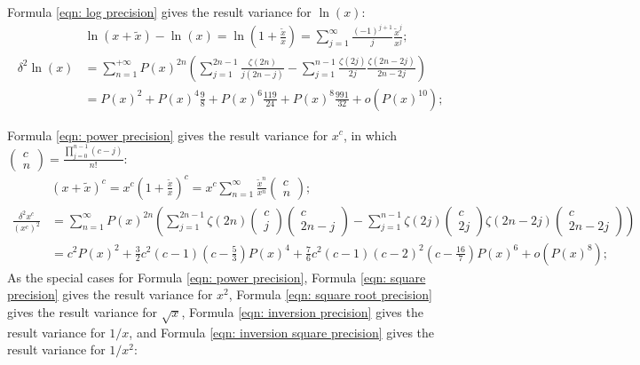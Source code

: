 \documentclass[twoside]{article}
\numberwithin{equation}{section}
\begin{document}
Formula \eqref{eqn: log precision} gives the result variance for $\ln(x)$:
\begin{align}
\label{eqn: log Taylor}
& \ln(x + \tilde{x}) - \ln(x) = \ln(1 + \frac{\tilde{x}}{x}) = \sum_{j=1}^{\infty} \frac{(-1)^{j+1}}{j} \frac{\tilde{x}^j}{x^j}; \\
\label{eqn: log precision}
\delta^2 \ln(x) &= \sum_{n=1}^{+\infty} P(x)^{2n} \left(\sum_{j=1}^{2n-1} \frac{\zeta(2n)}{j (2n-j)}
   - \sum_{j=1}^{n-1} \frac{\zeta(2j)}{2j} \frac{\zeta(2n - 2j)}{2n - 2j} \right) \\
 &= P(x)^2 + P(x)^4 \frac{9}{8}  + P(x)^6 \frac{119}{24} + P(x)^8 \frac{991}{32} + o(P(x)^{10}); 
\end{align}

Formula \eqref{eqn: power precision} gives the result variance for $x^c$, in which $\begin{pmatrix} c \\ n \end{pmatrix} = \frac{\prod_{j=0}^{n-1} (c -j)}{n!}$:
\begin{align}
\label{eqn: power Taylor}
&(x + \tilde{x})^c = x^c (1 + \frac{\tilde{x}}{x})^c = x^c \sum_{n=1}^{\infty} \frac{\tilde{x}^n}{x^n} \begin{pmatrix} c \\ n \end{pmatrix}; \\
\label{eqn: power precision}
\frac{\delta^2 x^c}{(x^c)^2} &= \sum_{n=1}^{\infty} P(x)^{2n} 
 \left( \sum_{j=1}^{2n-1} \zeta(2n) \begin{pmatrix} c \\ j \end{pmatrix} \begin{pmatrix} c \\ 2n - j \end{pmatrix}
 - \sum_{j=1}^{n-1} \zeta(2j) \begin{pmatrix} c \\ 2j \end{pmatrix} \zeta(2n - 2j) \begin{pmatrix} c \\ 2n -2 j \end{pmatrix}  \right)\\
 &= c^2 P(x)^2 + \frac{3}{2} c^2 (c-1) (c - \frac{5}{3}) P(x)^4 + \frac{7}{6} c^2 (c-1) (c-2)^2 (c - \frac{16}{7}) P(x)^6 + o(P(x)^8);
\end{align}
As the special cases for Formula \eqref{eqn: power precision}, Formula \eqref{eqn: square precision} gives the result variance for $x^2$, Formula \eqref{eqn: square root precision} gives the result variance for $\sqrt{x}$, Formula \eqref{eqn: inversion precision} gives the result variance for $1/x$, and Formula \eqref{eqn: inversion square precision} gives the result variance for $1/x^2$: 
\end{document}
